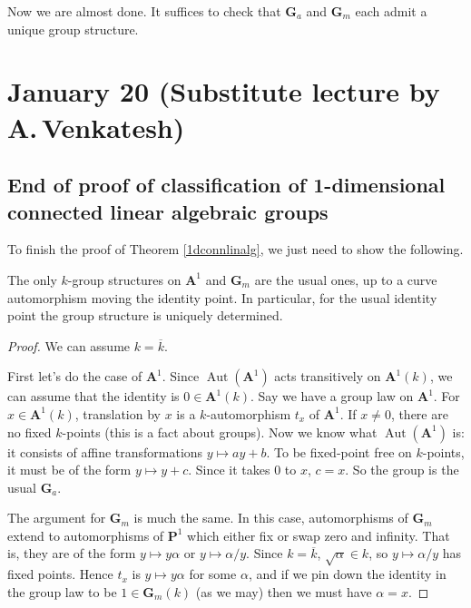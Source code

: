 \documentclass[10pt]{article}
\renewcommand{\AA}{\mathbf{A}}
\newcommand{\PP}{\mathbf{P}}
\renewcommand{\(}{\left(}
\renewcommand{\)}{\right)}
\renewcommand{\bar}{\overline}
\DeclareMathOperator{\Aut}{Aut}
\numberwithin{thm}{subsection}
\begin{document}
Now we are almost done. It suffices to check that $\mathbf{G}_a$ and $\mathbf{G}_m$ each admit a unique group structure.

\section{January 20 (Substitute lecture by A.\,Venkatesh)}
\subsection{End of proof of classification of 1-dimensional connected linear algebraic groups}
To finish the proof of Theorem \ref{1dconnlinalg}, we just need to show the following.
\begin{thm}The only $k$-group structures on $\AA^1$ and $\mathbf{G}_m$ 
are the usual ones, up to a curve automorphism moving the identity point.
In particular, for the usual identity point the group structure is uniquely determined.
\end{thm}
\begin{proof}
We can assume $k=\bar k$.

First let's do the case of $\AA^1$. Since $\Aut(\AA^1)$ acts transitively on
$\AA^1(k)$, we can assume that the identity is $0\in \AA^1(k)$.
Say we have a group law on $\AA^1$.
For $x\in \AA^1(k)$, translation by $x$ is a $k$-automorphism $t_x$ of
$\AA^1$. If $x\neq 0$, there are no fixed $k$-points (this is a fact about groups). Now we know what $\Aut(\AA^1)$ is: it consists of affine transformations
$y\mapsto ay+b$. To be fixed-point free on $k$-points, it must be of the form
$y\mapsto y+c$. Since it takes $0$ to $x$, $c=x$. So the group is the usual $\mathbf{G}_a$.

The argument for $\mathbf{G}_m$ is much the same.
In this case, automorphisms of $\mathbf{G}_m$ extend to automorphisms
of $\PP^1$ which either fix or swap zero and infinity. That is, they
are of the form $y\mapsto y\alpha$ or $y\mapsto \alpha/y$.
Since $k=\bar k$, $\sqrt\alpha\in k$, so $y\mapsto \alpha/y$ has fixed points.
Hence $t_x$ is $y\mapsto y\alpha$ for some $\alpha$,
and if we pin down the identity
in the group law to be $1\in \mathbf{G}_m(k)$ (as we may) then we must have $\alpha=x$.
\end{proof}
\end{document}
